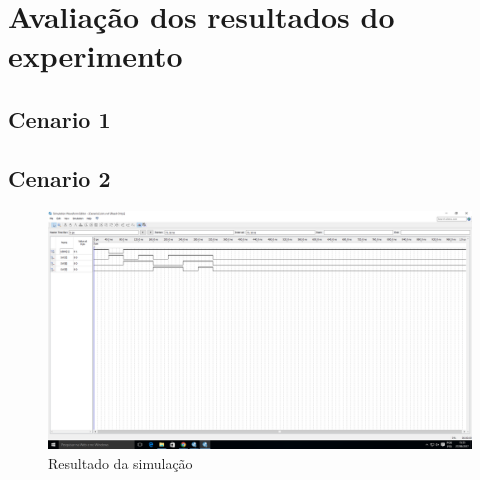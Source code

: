\chapter{Avaliação dos resultados do experimento}
\section{Cenario 1}


\section{Cenario 2}

	\begin{figure}[htb]
	    \centering
		\caption{\label{fig:printSimulacao}Resultado da simulação}
		\includegraphics[width=1\textwidth]{img/cenario2/printSimulacao}
	\end{figure}

